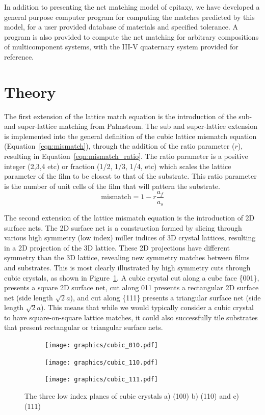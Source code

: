 \documentclass[final,5p,times,twocolumn]{elsarticle}
\begin{document}
In addition to presenting the net matching model of epitaxy, we have developed a general purpose computer program for computing the matches predicted by this model, for a user provided database of materials and specified tolerance. A program is also provided to compute the net matching for arbitrary compositions of multicomponent systems, with the III-V quaternary system provided for reference.

\section{Theory}
The first extension of the lattice match equation is the introduction of the sub- and super-lattice matching from Palmstrom\cite{Palmstrom1995}. The sub and super-lattice extension is implemented into the general definition of the cubic lattice mismatch equation (Equation~\ref{eqn:mismatch}), through the addition of the ratio parameter ($r$), resulting in Equation~\ref{eqn:mismatch_ratio}. The ratio parameter is a positive integer (2,3,4 etc) or fraction (1/2, 1/3, 1/4, etc) which scales the lattice parameter of the film to be closest to that of the substrate. This ratio parameter is the number of unit cells of the film that will pattern the substrate.
\begin{equation}
\text{mismatch} = 1 - r \frac{a_f}{a_s} \label{eqn:mismatch_ratio}
\end{equation}

The second extension of the lattice mismatch equation is the introduction of 2D surface nets. The 2D surface net is a construction formed by slicing through various high symmetry (low index) miller indices of 3D crystal lattices, resulting in a 2D projection of the 3D lattice. These 2D projections have different symmetry than the 3D lattice, revealing new symmetry matches between films and substrates. This is most clearly illustrated by high symmetry cuts through cubic crystals, as shown in Figure~\ref{fig:cubic_planes}. A cubic crystal cut along a cube face \{001\}, presents a square 2D surface net, cut along {011} presents a rectangular 2D surface net (side length $\sqrt{2}a$), and cut along \{111\} presents a triangular surface net (side length $\sqrt{2}a$). This means that while we would typically consider a cubic crystal to have square-on-square lattice matches, it could also successfully tile substrates that present rectangular or triangular surface nets.
\begin{figure}
    \centering
\begin{subfigure}{0.3\textwidth}
    \texttt{[image: graphics/cubic\_010.pdf]}
\end{subfigure}\quad
\begin{subfigure}{0.3\textwidth}
    \texttt{[image: graphics/cubic\_110.pdf]}
\end{subfigure}\quad
\begin{subfigure}{0.3\textwidth}
    \texttt{[image: graphics/cubic\_111.pdf]}
\end{subfigure}
    \caption{The three low index planes of cubic crystals a) (100) b) (110) and c) (111) \label{fig:cubic_planes}}
\end{figure}
\end{document}
